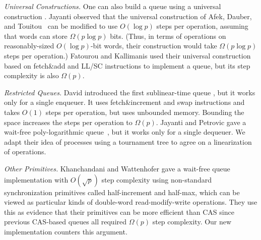 
\emph{Universal Constructions.}
One can also build a queue using a universal construction \cite{10.1145/114005.102808}.
Jayanti \cite{DBLP:conf/podc/Jayanti98a} observed that
the universal construction of Afek, Dauber, and
Touitou~\cite{DBLP:conf/stoc/AfekDT95} can be modified to use $O(\log p)$ steps per operation, 
assuming that words can store $\Omega(p \log p)$ bits. 
(Thus, in terms of operations on reasonably-sized $O(\log p)$-bit words, their construction would take $\Omega(p\log p)$ steps per operation.)
Fatourou and Kallimanis \cite{FK14} used their universal construction based on fetch\&add and LL/SC instructions
to implement a queue, but its step complexity is also $\Omega(p)$.

\emph{Restricted Queues.}
David introduced the first sublinear-time queue
\cite{DBLP:conf/wdag/David04}, but it works only for a single enqueuer.
It uses fetch\&increment and swap  instructions and takes $O(1)$ steps per operation, but
uses unbounded memory.  Bounding the space increases the steps per operation to $\Omega(p)$.
Jayanti and Petrovic gave a wait-free poly-logarithmic
queue~\cite{DBLP:conf/fsttcs/JayantiP05}, but it works only for a single dequeuer. 
We adapt their idea of processes using
a tournament tree to agree on a linearization of
operations.


\emph{Other Primitives.}
Khanchandani and Wattenhofer \cite{KW18} gave a wait-free queue implementation
with $O(\sqrt{p})$ step complexity using non-standard synchronization primitives
called half-increment and half-max, which can be viewed as particular kinds of
double-word read-modify-write operations.
They use this as evidence that their primitives can be more efficient than CAS
since previous CAS-based queues all required $\Omega(p)$ step complexity.
Our new implementation counters this argument.

